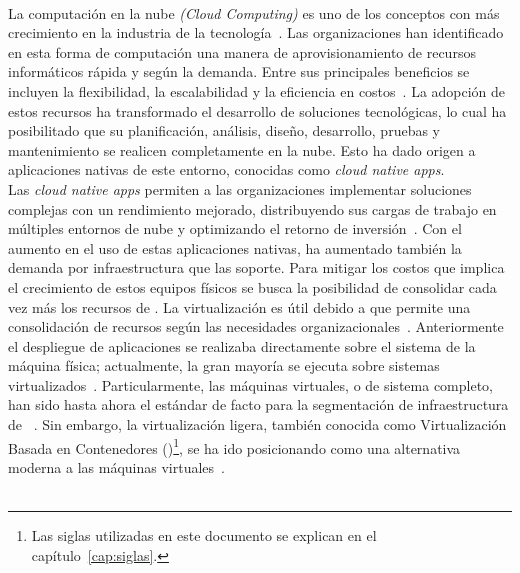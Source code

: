 \label{cap:introduccion}
\mbox{}\\
La computación en la nube \textit{(Cloud Computing)} es uno de los conceptos con más crecimiento en la industria de la tecnología~\citep{Jayaweera2024}. Las organizaciones han identificado en esta forma de computación una manera de aprovisionamiento de recursos informáticos rápida y según la demanda. Entre sus principales beneficios se incluyen la flexibilidad, la escalabilidad y la eficiencia en costos~\citep{Ahmadi2024}. La adopción de estos recursos ha transformado el desarrollo de soluciones tecnológicas, lo cual ha posibilitado que su planificación, análisis, diseño, desarrollo, pruebas y mantenimiento se realicen completamente en la nube. Esto ha dado origen a aplicaciones nativas de este entorno, conocidas como \textit{cloud native apps}.\\
Las \textit{cloud native apps} permiten a las organizaciones implementar soluciones complejas con un rendimiento mejorado, distribuyendo sus cargas de trabajo en múltiples entornos de nube y optimizando el retorno de inversión~\citep{Alonso2023}. Con el aumento en el uso de estas aplicaciones nativas, ha aumentado también la demanda por infraestructura que las soporte. Para mitigar los costos que implica el crecimiento de estos equipos físicos se busca la posibilidad de consolidar cada vez más los recursos de \TI. La virtualización es útil debido a que permite una consolidación de recursos según las necesidades organizacionales~\citep{chebiyyam2009server}. Anteriormente el despliegue de aplicaciones se realizaba directamente sobre el sistema de la máquina física; actualmente, la gran mayoría se ejecuta sobre sistemas virtualizados~\citep{Jain2016}. Particularmente, las máquinas virtuales, o de sistema completo, han sido hasta ahora el estándar de facto para la segmentación de infraestructura de \TI\ \citep{lorenxo2021}. Sin embargo, la virtualización ligera, también conocida como Virtualización Basada en Contenedores (\textbf{\VBC})\footnote{Las siglas utilizadas en este documento se explican en el capítulo~\ref{cap:siglas}.}, se ha ido posicionando como una alternativa moderna a las máquinas virtuales~\citep{raghavendra2018review}.\\ \\
